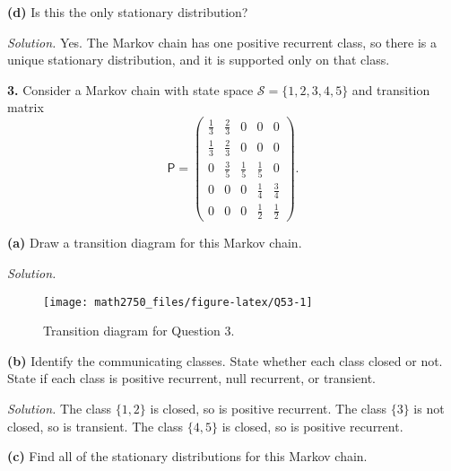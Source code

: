 \documentclass[
  a4paper,
]{article}
\theoremstyle{definition}
\theoremstyle{definition}
\theoremstyle{definition}
\theoremstyle{remark}
\begin{document}
\textbf{(d)} Is this the only stationary distribution?

\begin{myanswers}

\emph{Solution.} Yes. The Markov chain has one positive recurrent class, so there is a unique stationary distribution, and it is supported only on that class.

\end{myanswers}

\textbf{3.} Consider a Markov chain with state space \(\mathcal S = \{1,2,3,4,5\}\) and transition matrix
\[  \mathsf P = \begin{pmatrix} \frac13 & \frac23 & 0 &0 & 0 \\
                   \frac13 & \frac23 & 0 &0 & 0 \\
                   0 &\frac35 & \frac15 & \frac15 & 0 \\
                   0 & 0 & 0 & \frac14 &\frac34 \\
                   0 & 0 & 0 & \frac12 & \frac12 \end{pmatrix} . \]

\textbf{(a)} Draw a transition diagram for this Markov chain.

\begin{myanswers}

\emph{Solution.}

\begin{figure}

{\centering \texttt{[image: math2750\_files/figure-latex/Q53-1]} 

}

\caption{Transition diagram for Question 3.}\label{fig:Q53}
\end{figure}

\end{myanswers}

\textbf{(b)} Identify the communicating classes. State whether each class closed or not. State if each class is positive recurrent, null recurrent, or transient.

\begin{myanswers}

\emph{Solution.} The class \(\{1,2\}\) is closed, so is positive recurrent. The class \(\{3\}\) is not closed, so is transient. The class \(\{4,5\}\) is closed, so is positive recurrent.

\end{myanswers}

\textbf{(c)} Find all of the stationary distributions for this Markov chain.
\end{document}
